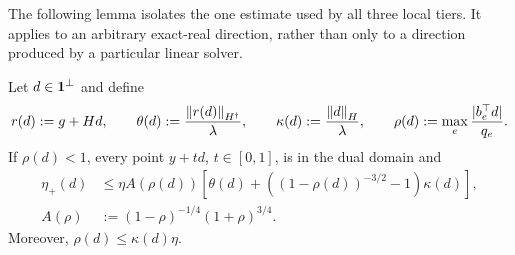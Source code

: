 The following lemma isolates the one estimate used by all three local tiers.
It applies to an arbitrary exact-real direction, rather than only to a direction
produced by a particular linear solver.

\begin{lemma}
\label{lem:unified-inexact}
Let $d\in\mathbf{1}^\perp$ and define
\begin{equation}
 r(d):=g+Hd,\qquad
 \theta(d):=\frac{\left\lVert r(d)\right\rVert_{H^\dagger}}{\lambda},\qquad
 \kappa(d):=\frac{\left\lVert d\right\rVert_H}{\lambda},\qquad
 \rho(d):=\max_e\frac{|b_e^\top d|}{q_e}.
 \label{eq:unified-direction-quantities}
\end{equation}
If $\rho(d)<1$, every point $y+td$, $t\in[0,1]$, is in the dual domain and
\begin{align}
 \eta_+(d)
 &\le \eta A(\rho(d))
 \left[\theta(d)+
 \left((1-\rho(d))^{-3/2}-1\right)\kappa(d)\right],
 \label{eq:unified-inexact-bound}\\
 A(\rho)&:=(1-\rho)^{-1/4}(1+\rho)^{3/4}.
 \nonumber
\end{align}
Moreover, $\rho(d)\le\kappa(d)\eta$.
\end{lemma}


